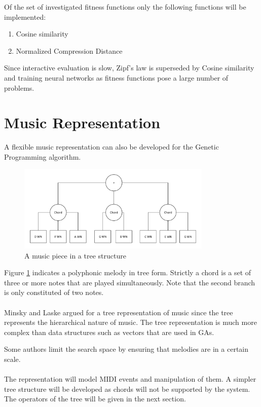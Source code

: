 Of the set of investigated fitness functions only the following functions will be implemented:
\begin{enumerate}
\item Cosine similarity
\item Normalized Compression Distance
\end{enumerate}
Since interactive evaluation is slow, Zipf's law is superseded by Cosine similarity and training neural networks as fitness functions pose a large number of problems.

\section{Music Representation}
A flexible music representation can also be developed for the Genetic Programming algorithm. 

\begin{figure}
\center
\includegraphics[width=350px]{../images/tree_stuct_piece.pdf}
\caption{A music piece in a tree structure}
\label{ims:musicpieceextrree}
\end{figure}
Figure \ref{ims:musicpieceextrree} indicates a polyphonic melody in tree form. Strictly a chord is a set of three or more notes that are played simultaneously. Note that the second branch is only constituted of two notes.
\\
\\
Minsky and Laske \cite{Minsky1992} argued for a tree representation of music since the tree represents the hierarchical nature of music. The tree representation is much more complex than data structures such as vectors that are used in \acp{GA}.

Some authors \cite{Biles1994} limit the search space by ensuring that melodies are in a certain scale.
\\
\\
The representation will model \ac{MIDI} events and manipulation of them. A simpler tree structure will be developed as chords will not be supported by the system. The operators of the tree will be given in the next section.

